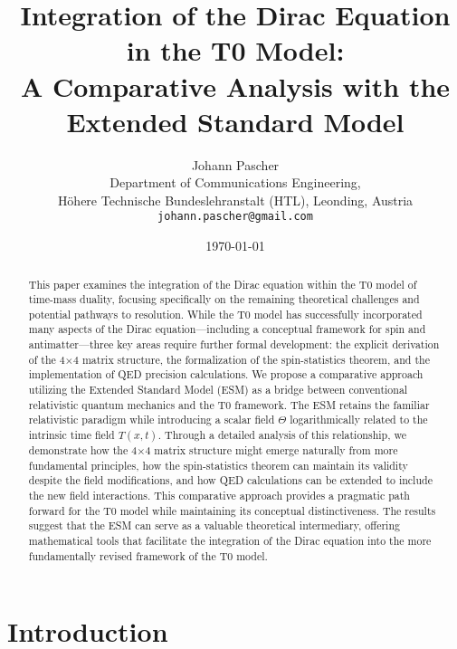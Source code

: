 \documentclass[12pt,a4paper]{article}
\begin{document}
	
	\title{Integration of the Dirac Equation in the T0 Model: \\A Comparative Analysis with the Extended Standard Model}
	\author{Johann Pascher\\
		Department of Communications Engineering, \\Höhere Technische Bundeslehranstalt (HTL), Leonding, Austria\\
		\texttt{johann.pascher@gmail.com}}
	\date{\today}
	
	\maketitle
	
	\begin{abstract}
		This paper examines the integration of the Dirac equation within the T0 model of time-mass duality, focusing specifically on the remaining theoretical challenges and potential pathways to resolution. While the T0 model has successfully incorporated many aspects of the Dirac equation—including a conceptual framework for spin and antimatter—three key areas require further formal development: the explicit derivation of the 4$\times$4 matrix structure, the formalization of the spin-statistics theorem, and the implementation of QED precision calculations. We propose a comparative approach utilizing the Extended Standard Model (ESM) as a bridge between conventional relativistic quantum mechanics and the T0 framework. The ESM retains the familiar relativistic paradigm while introducing a scalar field $\Theta$ logarithmically related to the intrinsic time field $T(x,t)$. Through a detailed analysis of this relationship, we demonstrate how the 4$\times$4 matrix structure might emerge naturally from more fundamental principles, how the spin-statistics theorem can maintain its validity despite the field modifications, and how QED calculations can be extended to include the new field interactions. This comparative approach provides a pragmatic path forward for the T0 model while maintaining its conceptual distinctiveness. The results suggest that the ESM can serve as a valuable theoretical intermediary, offering mathematical tools that facilitate the integration of the Dirac equation into the more fundamentally revised framework of the T0 model.
	\end{abstract}
	\newpage
	\tableofcontents
	\newpage
	
	\section{Introduction}
	\label{sec:introduction}
	
\end{document}
